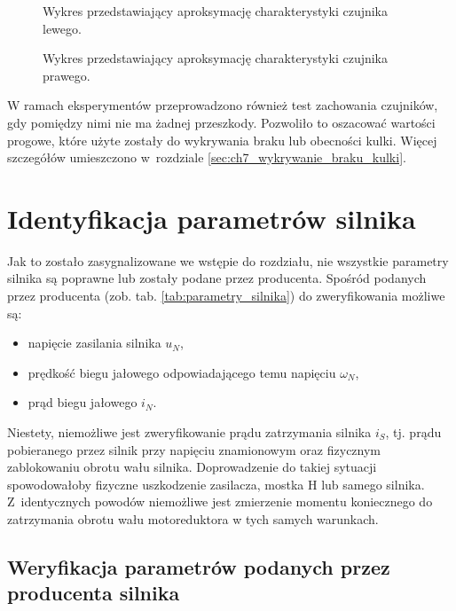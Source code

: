 \begin{figure}[h]
    \centering
    
    \caption{Wykres przedstawiający aproksymację charakterystyki czujnika lewego.}
    \label{fig:aproksymacja_czujnika_lewego}
\end{figure}

\begin{figure}[h]
    \centering
    
    \caption{Wykres przedstawiający aproksymację charakterystyki czujnika prawego.}
    \label{fig:aproksymacja_czujnika_prawego}
\end{figure}

W ramach eksperymentów przeprowadzono również test zachowania czujników, gdy pomiędzy nimi nie ma żadnej przeszkody. Pozwoliło to oszacować wartości progowe, które użyte zostały do wykrywania braku lub obecności kulki. Więcej szczegółów umieszczono w~rozdziale \ref{sec:ch7_wykrywanie_braku_kulki}.

\section{Identyfikacja parametrów silnika}
\label{sec:ch5_identyfikacja_parametrow_silnika}

Jak to zostało zasygnalizowane we wstępie do rozdziału, nie wszystkie parametry silnika są poprawne lub zostały podane przez producenta. Spośród podanych przez producenta (zob. tab. \ref{tab:parametry_silnika}) do zweryfikowania możliwe są:

\begin{itemize}
    \item napięcie zasilania silnika $u_N$,
    \item prędkość biegu jałowego odpowiadającego temu napięciu $\omega_N$,
    \item prąd biegu jałowego $i_N$.
\end{itemize}

Niestety, niemożliwe jest zweryfikowanie prądu zatrzymania silnika $i_S$, tj. prądu pobieranego przez silnik przy napięciu znamionowym oraz fizycznym zablokowaniu obrotu wału silnika. Doprowadzenie do takiej sytuacji spowodowałoby fizyczne uszkodzenie zasilacza, mostka H lub samego silnika. Z~identycznych powodów niemożliwe jest zmierzenie momentu koniecznego do zatrzymania obrotu wału motoreduktora w tych samych warunkach.

\subsection{Weryfikacja parametrów podanych przez producenta silnika}
\label{subsec:ch5_weryfikacja_parametrow_producenta_silnika}

